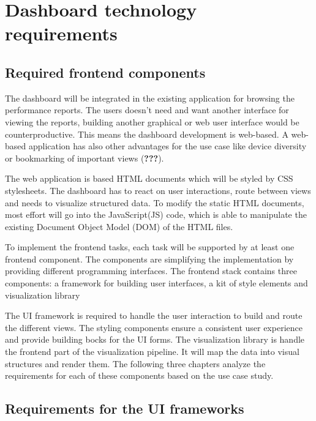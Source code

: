 \documentclass[american,a4paper,oneside,,tablecaptionabove]{scrbook}
\begin{document}
\section{Dashboard technology
requirements}\label{dashboard-technology-requirements}

\subsection{Required frontend
components}\label{required-frontend-components}

The dashboard will be integrated in the existing application for
browsing the performance reports. The users doesn't need and want
another interface for viewing the reports, building another graphical or
web user interface would be counterproductive. This means the dashboard
development is web-based. A web-based application has also other
advantages for the use case like device diversity or bookmarking of
important views ({\textbf{???}}).

The web application is based HTML documents which will be styled by CSS
stylesheets. The dashboard has to react on user interactions, route
between views and needs to visualize structured data. To modify the
static HTML documents, most effort will go into the JavaScript(JS) code,
which is able to manipulate the existing Document Object Model (DOM) of
the HTML files.

To implement the frontend tasks, each task will be supported by at least
one frontend component. The components are simplifying the
implementation by providing different programming interfaces. The
frontend stack contains three components: a framework for building user
interfaces, a kit of style elements and visualization library

The UI framework is required to handle the user interaction to build and
route the different views. The styling components ensure a consistent
user experience and provide building bocks for the UI forms. The
visualization library is handle the frontend part of the visualization
pipeline. It will map the data into visual structures and render them.
The following three chapters analyze the requirements for each of these
components based on the use case study.

\subsection{Requirements for the UI
frameworks}\label{requirements-for-the-ui-frameworks}
\end{document}
